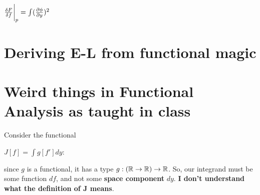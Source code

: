 $\fdv{F}{f}{\bigg \rvert_p} = \int (\pdv{\phi}{y})^2$


\section{Deriving E-L from functional magic}

\section{Weird things in Functional Analysis as taught in class}

Consider the functional

$J[f] = \int g[f'] dy$:

since $g$ is a functional, it has a type $g: (\mathbb{R} \to \mathbb{R}) \to \mathbb{R}$.
So, our integrand must be some function $df$, and not some
\textbf{space component} $dy$. \textbf{I don't understand what the definition of J means}.

